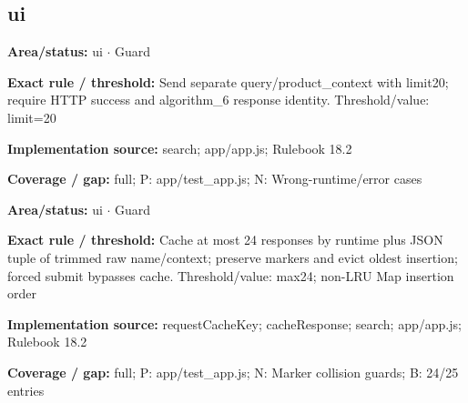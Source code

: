 \subsection*{ui}
\begin{tcolorbox}[enhanced,breakable,colback=white,colframe=Muted!45,boxrule=0.45pt,arc=1.5pt,left=6pt,right=6pt,top=5pt,bottom=5pt,title={\texttt{UI-API-REQUEST-05}},title after break={\texttt{UI-API-REQUEST-05}\ (continued)},fonttitle=\headingfont\bfseries\color{Navy},coltitle=Navy]
\textbf{Area/status:} ui $\boldsymbol{\cdot}$ Guard\par
\smallskip
\textbf{Exact rule / threshold:} Send separate query/\allowbreak{}product\_\allowbreak{}context with limit20; require HTTP success and algorithm\_\allowbreak{}6 response identity. Threshold/\allowbreak{}value: limit=20\par
\smallskip
\textbf{Implementation source:} search; app/\allowbreak{}app.js; Rulebook 18.2\par
\smallskip
\textbf{Coverage / gap:} full; P: app/\allowbreak{}test\_\allowbreak{}app.js; N: Wrong-runtime/\allowbreak{}error cases
\end{tcolorbox}
\begin{tcolorbox}[enhanced,breakable,colback=white,colframe=Muted!45,boxrule=0.45pt,arc=1.5pt,left=6pt,right=6pt,top=5pt,bottom=5pt,title={\texttt{UI-CACHE-04}},title after break={\texttt{UI-CACHE-04}\ (continued)},fonttitle=\headingfont\bfseries\color{Navy},coltitle=Navy]
\textbf{Area/status:} ui $\boldsymbol{\cdot}$ Guard\par
\smallskip
\textbf{Exact rule / threshold:} Cache at most 24 responses by runtime plus JSON tuple of trimmed raw name/\allowbreak{}context; preserve markers and evict oldest insertion; forced submit bypasses cache. Threshold/\allowbreak{}value: max24; non-LRU Map insertion order\par
\smallskip
\textbf{Implementation source:} requestCacheKey; cacheResponse; search; app/\allowbreak{}app.js; Rulebook 18.2\par
\smallskip
\textbf{Coverage / gap:} full; P: app/\allowbreak{}test\_\allowbreak{}app.js; N: Marker collision guards; B: 24/\allowbreak{}25 entries
\end{tcolorbox}
